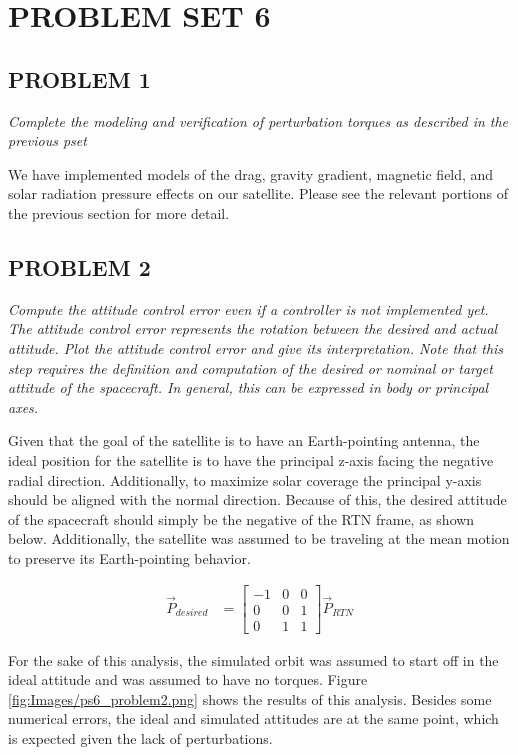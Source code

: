 \section{\Large PROBLEM SET 6}
\subsection{PROBLEM 1}
\textit{Complete the modeling and verification of perturbation torques as described in the previous pset}

We have implemented models of the drag, gravity gradient, magnetic field, and solar radiation pressure effects on our satellite. Please see the relevant portions of the previous section for more detail.


\subsection{PROBLEM 2}
\textit{Compute the attitude control error even if a controller is not implemented yet. The attitude control error represents the rotation between the desired and actual attitude. Plot the attitude control error and give its interpretation. Note that this step requires the definition and computation of the desired or nominal or target attitude of the spacecraft. In general, this can be expressed in body or principal axes.}

Given that the goal of the satellite is to have an Earth-pointing antenna, the ideal position for the satellite is to have the principal z-axis facing the negative radial direction. Additionally, to maximize solar coverage the principal y-axis should be aligned with the normal direction. Because of this, the desired attitude of the spacecraft should simply be the negative of the RTN frame, as shown below. Additionally, the satellite was assumed to be traveling at the mean motion to preserve its Earth-pointing behavior.

\begin{align*}
    \Vec{P}_{desired} &= 
    \begin{bmatrix}
    -1 & 0 & 0 \\
    0 & 0 & 1 \\
    0 & 1 & 1
    \end{bmatrix}
    \Vec{P}_{RTN}
\end{align*}

For the sake of this analysis, the simulated orbit was assumed to start off in the ideal attitude and was assumed to have no torques. Figure \ref{fig:Images/ps6_problem2.png} shows the results of this analysis. Besides some numerical errors, the ideal and simulated attitudes are at the same point, which is expected given the lack of perturbations.

